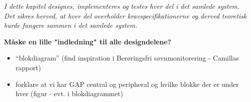 \textit{I dette kapitel designes, implementeres og testes hver del i det samlede system. Det sikres herved, at hver del overholder kravspecifikationerne og derved teoretisk burde fungere sammen i det samlede system.}

\textbf{Måske en lille "indledning" til alle designdelene?}
\begin{itemize}
\item “blokdiagram” (find inspiration i Berøringsfri søvnmonitorering - Camillas rapport)
\item forklare at vi har GAP central og peripheral og hvilke blokke der er under hver (figur - evt. i blokdiagrammet)
\end{itemize}
